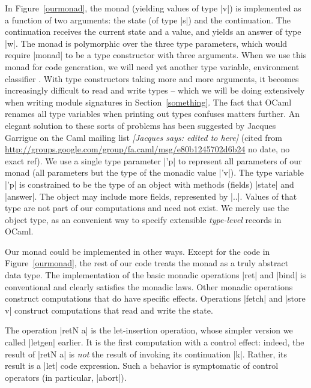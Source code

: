 \documentclass[draft]{elsart}
\newcommand{\jacques}[1]{{\it [Jacques says: #1]}}
\begin{document}
In Figure~\ref{ourmonad}, the monad (yielding values of type |v|)
is implemented as a function of two
arguments: the state (of type |s|) and the continuation. The
continuation receives the current state and a value, and
yields an answer of type |w|.  The monad is polymorphic over the
three type parameters, which would require |monad| to be a type
constructor with three arguments. When we use this monad for code
generation, we will need yet another type variable, environment
classifier \cite{taha-environment}. With type constructors taking more
and more arguments, it becomes increasingly difficult to read and write
types -- which we will be doing extensively when writing module
signatures in Section~\ref{something}. The fact that OCaml renames all type
variables when printing out types confuses matters further. An elegant
solution to these sorts of problems has been suggested by 
Jacques Garrigue on the Caml mailing list 
\jacques{edited to here}
(cited from
\url{http://groups.google.com/group/fa.caml/msg/e80b1245702d6b24}
no date, no exact ref). We use a single type parameter |'p| to
represent all parameters of our monad (all parameters but the type of
the monadic value |'v|). The type variable |'p| is constrained to be
the type of an object with methods (fields) |state| and |answer|. The
object may include more fields, represented by |..|. Values of that
type are not part of our computations and need not exist. We merely
use the object type, as an convenient way to specify extensible
\emph{type-level} records in OCaml.     

Our monad could be implemented in other ways. Except for the code in
Figure~\ref{ourmonad}, the rest of our code treats the monad as a
truly abstract data type. The implementation of the basic monadic
operations |ret| and |bind| is conventional and clearly satisfies the
monadic laws. Other monadic operations construct computations that do
have specific effects.  Operations |fetch| and |store v| construct
computations that read and write the state.

The operation |retN a| is the let-insertion operation, whose simpler
version we called |letgen| earlier. It is the first computation with
a control effect: indeed, the result of |retN a| is \emph{not} the
result of invoking its continuation |k|. Rather, its result is a |let|
code expression. Such a behavior is symptomatic of control operators
(in particular, |abort|).
\end{document}
